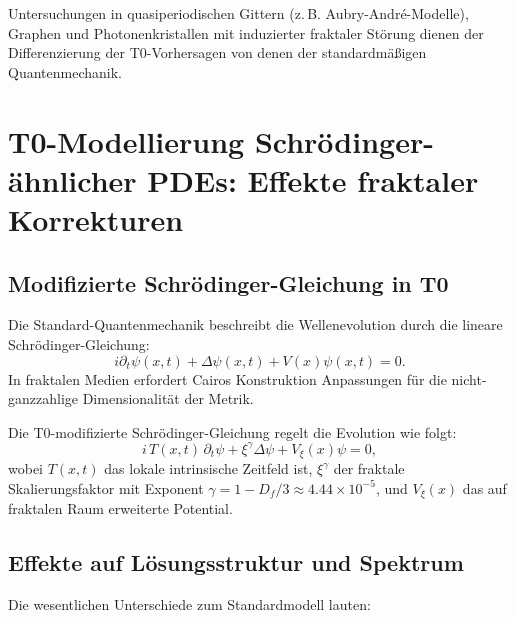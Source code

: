 	Untersuchungen in quasiperiodischen Gittern (z.\,B. Aubry-André-Modelle), Graphen und Photonenkristallen mit induzierter fraktaler Störung dienen der Differenzierung der T0-Vorhersagen von denen der standardmäßigen Quantenmechanik.
	
	\section{T0-Modellierung Schrödinger-ähnlicher PDEs: Effekte fraktaler Korrekturen}
	
	\subsection{Modifizierte Schrödinger-Gleichung in T0}
	
	Die Standard-Quantenmechanik beschreibt die Wellenevolution durch die lineare Schrödinger-Gleichung:
	\begin{equation}
		i \partial_t \psi(x,t) + \Delta \psi(x,t) + V(x)\psi(x,t) = 0.
	\end{equation}
	In fraktalen Medien erfordert Cairos Konstruktion Anpassungen für die nicht-ganzzahlige Dimensionalität der Metrik.
	
	Die T0-modifizierte Schrödinger-Gleichung regelt die Evolution wie folgt:
	\begin{equation}
		i\, T(x,t)\, \partial_t \psi + \xi^\gamma \Delta \psi + V_\xi(x)\psi = 0,
	\end{equation}
	wobei $T(x,t)$ das lokale intrinsische Zeitfeld ist, $\xi^\gamma$ der fraktale Skalierungsfaktor mit Exponent $\gamma = 1 - D_f/3 \approx 4.44 \times 10^{-5}$, und $V_\xi(x)$ das auf fraktalen Raum erweiterte Potential.
	
	\subsection{Effekte auf Lösungsstruktur und Spektrum}
	
	Die wesentlichen Unterschiede zum Standardmodell lauten:
	
